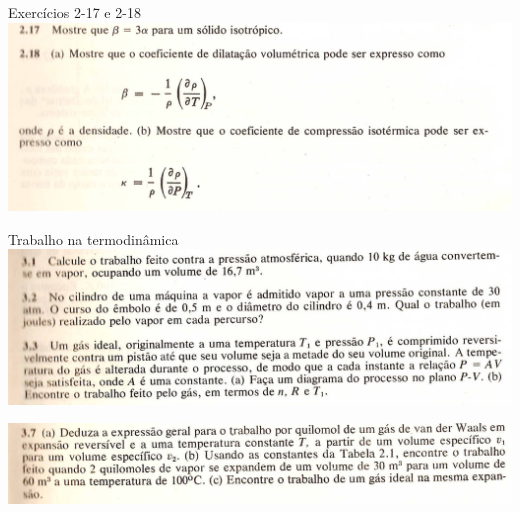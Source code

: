 \begin{frame}{Exercícios 2-17 e 2-18}
    \includegraphics[width=\textwidth]{images/Captura de tela de 2023-04-12 13-41-26.png}
\end{frame}

\begin{frame}{Trabalho na termodinâmica}
    \centering
    \includegraphics[width=\textwidth]{images/Captura de tela de 2023-04-17 13-42-39.png}

    \includegraphics[width=\textwidth]{images/Captura de tela de 2023-04-17 13-57-07.png}
\end{frame}

